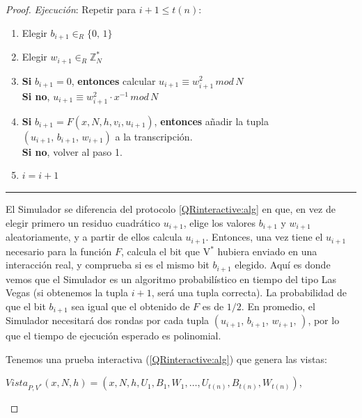 \begin{proof}
	\textit{Ejecución}: Repetir para $i+1 \leq t(n)$:
	
	\begin{enumerate}
		\item Elegir $b_{i+1} \in_R \{0,\,1\}$
		
		\item Elegir $w_{i+1} \in_R \mathbb{Z}^*_N$
		
		\item \textbf{Si} $b_{i+1} = 0$, \textbf{entonces} calcular \qquad $u_{i+1} \equiv w_{i+1}^2 \, mod \,  N$ \\
			  \textbf{Si no}, \qquad \qquad \qquad \qquad \qquad \qquad \: $u_{i+1} \equiv w_{i+1}^2 \cdot x^{-1} \, mod \,  N$
			  
		\item \textbf{Si} $b_{i+1} = F(x,N,h,v_i,u_{i+1})$, \textbf{entonces} añadir la tupla \\ $(u_{i+1},\,b_{i+1},\,w_{i+1})$ a la transcripción. \\
			  \textbf{Si no}, volver al paso 1.
		
		\item $i = i+1$
		
	\end{enumerate}
	
	\rule{\textwidth}{1pt}
	
	\hfill
	
	El Simulador se diferencia del protocolo \ref{QRinteractive:alg} en que, en vez de elegir primero un residuo cuadrático $u_{i+1}$, elige los valores $b_{i+1}$ y $w_{i+1}$ aleatoriamente, y a partir de ellos calcula $u_{i+1}$. Entonces, una vez tiene el $u_{i+1}$ necesario para la función $F$, calcula el bit que V$^*$ hubiera enviado en una interacción real, y comprueba si es el mismo bit $b_{i+1}$ elegido. Aquí es donde vemos que el Simulador es un algoritmo probabilístico en tiempo del tipo Las Vegas (si obtenemos la tupla $i+1$, será una tupla correcta). La probabilidad de que el bit $b_{i+1}$ sea igual que el obtenido de $F$ es de $1/2$. En promedio, el Simulador necesitará dos rondas por cada tupla $(u_{i+1},\,b_{i+1},\,w_{i+1},\,)$, por lo que el tiempo de ejecución esperado es polinomial. 
	
	
	\hfil
	
	Tenemos una prueba interactiva (\ref{QRinteractive:alg}) que genera las vistas:
	
	 \begin{center}
	 	$Vista_{P,V^*}(x,N,h) = (x,N,h,U_1,B_1,W_1,\dots , U_{t(n)}, B_{t(n)}, W_{t(n)})$,
	 \end{center}
	 

\end{proof}
